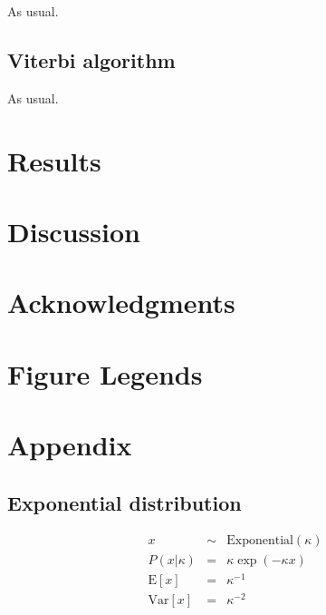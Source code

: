 \documentclass[10pt]{article}
\begin{document}
As usual.

\subsection{Viterbi algorithm}

As usual.


\newpage
\section{Results}




\section{Discussion}


\newpage
\section{Acknowledgments}



\clearpage
\section{Figure Legends}

\clearpage
\section{Appendix}

\subsection{Exponential distribution}

\begin{eqnarray*}
x & \sim & \mbox{Exponential}(\kappa) \\
P(x|\kappa) & = & \kappa \exp(-\kappa x) \\
\mbox{E}[x] & = & \kappa^{-1} \\
\mbox{Var}[x] & = & \kappa^{-2}
\end{eqnarray*}
\end{document}
